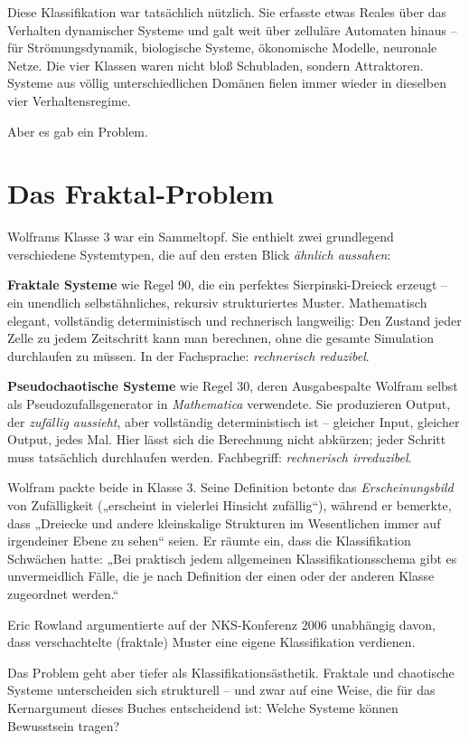 \documentclass[11pt, twoside, openright]{book}
\begin{document}
Diese Klassifikation war tatsächlich nützlich. Sie erfasste etwas Reales über das Verhalten dynamischer Systeme und galt weit über zelluläre Automaten hinaus -- für Strömungsdynamik, biologische Systeme, ökonomische Modelle, neuronale Netze. Die vier Klassen waren nicht bloß Schubladen, sondern Attraktoren. Systeme aus völlig unterschiedlichen Domänen fielen immer wieder in dieselben vier Verhaltensregime.

Aber es gab ein Problem.

\section*{Das Fraktal-Problem}

Wolframs Klasse 3 war ein Sammeltopf. Sie enthielt zwei grundlegend verschiedene Systemtypen, die auf den ersten Blick \textit{ähnlich aussahen}:

\textbf{Fraktale Systeme} wie Regel 90, die ein perfektes Sierpinski-Dreieck erzeugt -- ein unendlich selbstähnliches, rekursiv strukturiertes Muster. Mathematisch elegant, vollständig deterministisch und rechnerisch langweilig: Den Zustand jeder Zelle zu jedem Zeitschritt kann man berechnen, ohne die gesamte Simulation durchlaufen zu müssen. In der Fachsprache: \textit{rechnerisch reduzibel}.

\textbf{Pseudochaotische Systeme} wie Regel 30, deren Ausgabespalte Wolfram selbst als Pseudozufallsgenerator in \textit{Mathematica} verwendete. Sie produzieren Output, der \textit{zufällig aussieht}, aber vollständig deterministisch ist -- gleicher Input, gleicher Output, jedes Mal. Hier lässt sich die Berechnung nicht abkürzen; jeder Schritt muss tatsächlich durchlaufen werden. Fachbegriff: \textit{rechnerisch irreduzibel}.

Wolfram packte beide in Klasse 3. Seine Definition betonte das \textit{Erscheinungsbild} von Zufälligkeit („erscheint in vielerlei Hinsicht zufällig“), während er bemerkte, dass „Dreiecke und andere kleinskalige Strukturen im Wesentlichen immer auf irgendeiner Ebene zu sehen“ seien. Er räumte ein, dass die Klassifikation Schwächen hatte: „Bei praktisch jedem allgemeinen Klassifikationsschema gibt es unvermeidlich Fälle, die je nach Definition der einen oder der anderen Klasse zugeordnet werden.“

Eric Rowland argumentierte auf der NKS-Konferenz 2006 unabhängig davon, dass verschachtelte (fraktale) Muster eine eigene Klassifikation verdienen.

Das Problem geht aber tiefer als Klassifikationsästhetik. Fraktale und chaotische Systeme unterscheiden sich strukturell -- und zwar auf eine Weise, die für das Kernargument dieses Buches entscheidend ist: Welche Systeme können Bewusstsein tragen?
\end{document}
